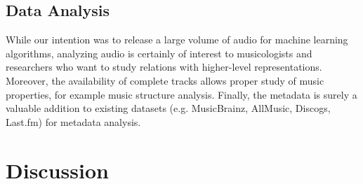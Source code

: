 \documentclass{article}
\begin{document}

\subsection{Data Analysis}

While our intention was to release a large volume of audio for machine learning algorithms, analyzing audio is certainly of interest to musicologists and researchers who want to study relations with higher-level representations. 
Moreover, the availability of complete tracks allows proper study of music properties, for example music structure analysis.
Finally, the metadata is surely a valuable addition to existing datasets (e.g. MusicBrainz, AllMusic, Discogs, Last.fm) for metadata analysis.


\section{Discussion} %



\end{document}

